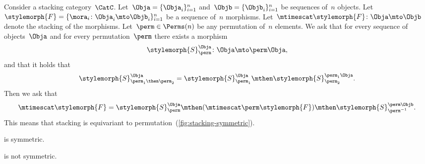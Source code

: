 \begin{ctdefinition}
    \label{def:symmetric-stacking-category}
    Consider a stacking category~$\CatC$.
    Let~$\Obja = \{\Obja_i\}_{i=1}^n$ and~$\Objb = \{\Objb_i\}_{i=1}^n$ be sequences of~$n$ objects.
    Let~$\stylemorph{F} = \{\mora_i \colon \Obja_i \mto  \Objb_i   \}_{i=1}^n$ be a sequence of~$n$ morphisms.
    Let~$\mtimescat \stylemorph{F}\colon \Obja \mto \Objb$ denote the stacking of the morphisms.
    Let~$\perm\in\Perms(n)$ be any permutation of~$n$ elements.
    We ask that for every sequence of objects~$\Obja$ and for every permutation~$\perm$ there exists a morphism
    \begin{equation}
        \stylemorph{S}^{\Obja}_\perm \colon \Obja \mto \perm  \Obja,
    \end{equation}
    and that it holds that
    \begin{equation}
        \stylemorph{S}_{\perm_1 \then \perm_2}^{\Obja}
        =
        \stylemorph{S}_{\perm_1}^{\Obja} \mthen
        \stylemorph{S}_{\perm_2}^{\perm_1 \Obja} .
    \end{equation}
    Then we ask that
    \begin{equation}
        \label{eq:symmetric-condition}
        \mtimescat \stylemorph{F}  =
        \stylemorph{S}^{\Obja}_{\perm}
        \mthen
        (\mtimescat
        \perm \stylemorph{F} )
        \mthen
        \stylemorph{S}^{\perm \Objb}_{\perm^{-1}}.
    \end{equation}
    This means that stacking is equivariant to permutation~(\cref{fig:stacking-symmetric}).
\end{ctdefinition}

\begin{figure*}[b]
    \centering
    \caption{
        Illustration of \cref{eq:symmetric-condition}.
    }
    \label{fig:stacking-symmetric}
\end{figure*}

\begin{example}
    \SetL is symmetric.
\end{example}

\begin{lemma}
    \Effects is not symmetric.
\end{lemma}

